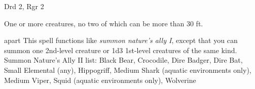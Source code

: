 
\begin{description*}
\item[Level:] Drd 2, Rgr 2
\item[Effect:] One or more creatures, no two of which can be more than 30 ft.
\end{description*}

apart
This spell functions like \textit{summon nature's ally I}, except that you can
summon one 2nd-level creature or 1d3 1st-level creatures of the same kind.
Summon Nature's Ally II list: Black Bear, Crocodile, Dire Badger, Dire Bat, Small Elemental (any), Hippogriff, Medium Shark (aquatic environments only), Medium Viper, Squid (aquatic environments only), Wolverine